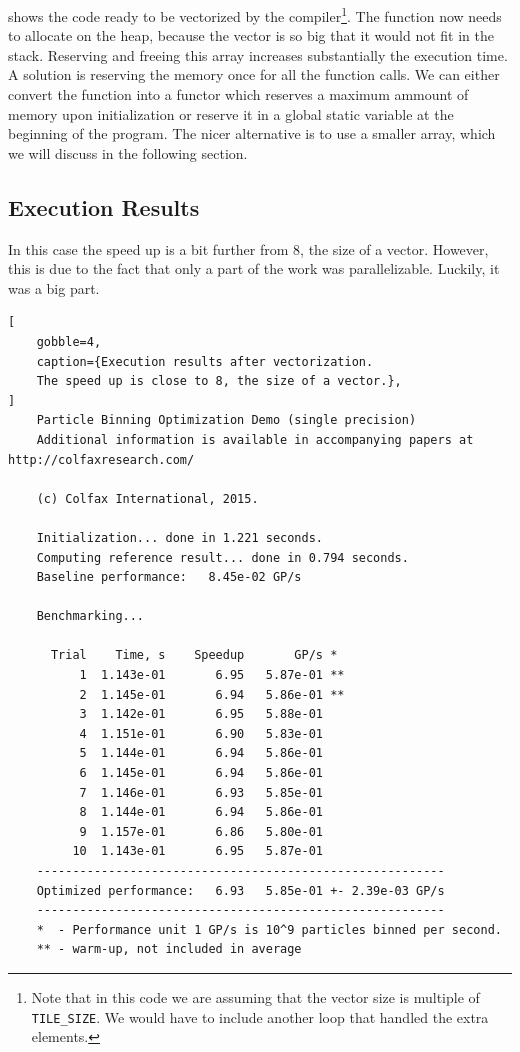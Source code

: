 \documentclass[
    12pt, %
]{fphw}
\newcommand{\tech}{\texttt}
\begin{document}
     shows the code
ready to be vectorized by the compiler\footnote{
    Note that in this code we are assuming that
    the vector size is multiple of \tech{TILE\_SIZE}.
    We would have to include another loop that handled the extra elements.
}. The function now needs to allocate on the heap,
because the vector is so big that it would not fit in the stack.
Reserving and freeing this array increases substantially the execution time.
A solution is reserving the memory once for all the function calls.
We can either convert the function into a functor which
reserves a maximum ammount of memory upon initialization or
reserve it in a global static variable at the beginning of the program.
The nicer alternative is to use a smaller array,
which we will discuss in the following section.

\subsection{Execution Results}

    In this case the speed up is a bit further from $8$, the size of a vector.
However, this is due to the fact that only a part of the work was parallelizable.
Luckily, it was a big part.

\begin{lstlisting}[
    gobble=4,
    caption={Execution results after vectorization.
    The speed up is close to 8, the size of a vector.},
]
    Particle Binning Optimization Demo (single precision)
    Additional information is available in accompanying papers at http://colfaxresearch.com/

    (c) Colfax International, 2015.

    Initialization... done in 1.221 seconds.
    Computing reference result... done in 0.794 seconds.
    Baseline performance:   8.45e-02 GP/s

    Benchmarking...

      Trial    Time, s    Speedup       GP/s *
          1  1.143e-01       6.95   5.87e-01 **
          2  1.145e-01       6.94   5.86e-01 **
          3  1.142e-01       6.95   5.88e-01 
          4  1.151e-01       6.90   5.83e-01 
          5  1.144e-01       6.94   5.86e-01 
          6  1.145e-01       6.94   5.86e-01 
          7  1.146e-01       6.93   5.85e-01 
          8  1.144e-01       6.94   5.86e-01 
          9  1.157e-01       6.86   5.80e-01 
         10  1.143e-01       6.95   5.87e-01 
    ---------------------------------------------------------
    Optimized performance:   6.93   5.85e-01 +- 2.39e-03 GP/s
    ---------------------------------------------------------
    *  - Performance unit 1 GP/s is 10^9 particles binned per second.
    ** - warm-up, not included in average

\end{lstlisting}
\end{document}
